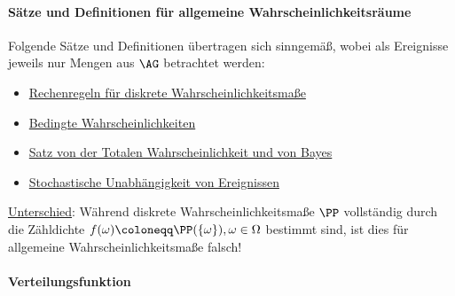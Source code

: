 \newpage
\paragraph{Sätze und Definitionen für allgemeine Wahrscheinlichkeitsräume}
Folgende Sätze und Definitionen übertragen sich sinngemäß, wobei als Ereignisse jeweils nur Mengen aus $\AG$ betrachtet werden:
\begin{itemize}
	\item \hyperref[rules]{Rechenregeln für diskrete Wahrscheinlichkeitsmaße}
	\item \hyperref[conditioned]{Bedingte Wahrscheinlichkeiten}
	\item \hyperref[bayes]{Satz von der Totalen Wahrscheinlichkeit und von Bayes}
	\item \hyperref[independant]{Stochastische Unabhängigkeit von Ereignissen}
\end{itemize}
\underline{Unterschied}: Während diskrete Wahrscheinlichkeitsmaße $\PP$ vollständig durch die Zähldichte $f(\omega)\coloneqq\PP(\{\omega\}),\omega\in\Omega$ bestimmt sind, ist dies für allgemeine Wahrscheinlichkeitsmaße falsch!

\paragraph{Verteilungsfunktion}